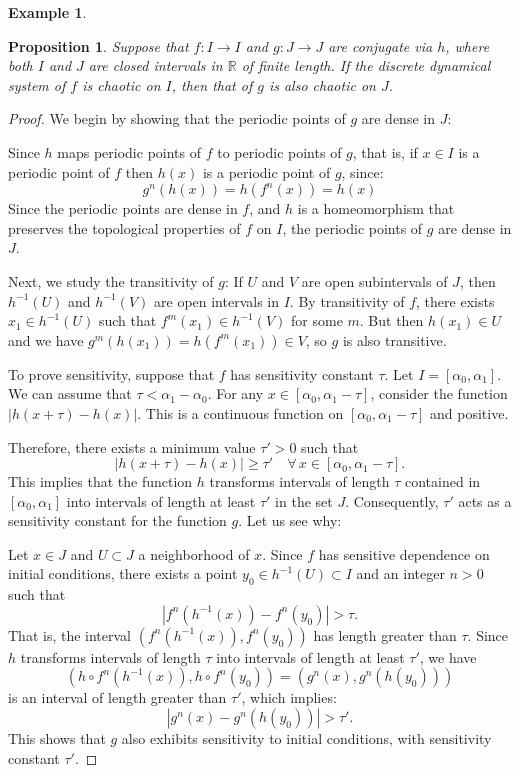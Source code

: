 \documentclass[12pt,a4paper]{report}
\newtheorem{proposicion}{Proposition}[section]
\theoremstyle{definition}
\newtheorem{ejemplo}{Example}[section]
\begin{document}
\begin{ejemplo}
\begin{proposicion}\label{Prop5}
Suppose that $f: I \to I$ and $g: J \to J$ are conjugate via $h$, where both $I$ and $J$ are closed intervals in $\mathbb{R}$ of finite length. If the discrete dynamical system of $f$ is chaotic on $I$, then that of $g$ is also chaotic on $J$.
\end{proposicion}

\begin{proof}
We begin by showing that the periodic points of $g$ are dense in $J$:

Since $h$ maps periodic points of $f$ to periodic points of $g$, that is, if $x \in I$ is a periodic point of $f$ then $h(x)$ is a periodic point of $g$, since:
\[
g^n(h(x)) = h(f^n(x)) = h(x)
\]
%
Since the periodic points are dense in $f$, and $h$ is a homeomorphism that preserves the topological properties of $f$ on $I$, the periodic points of $g$ are dense in $J$.

Next, we study the transitivity of $g$:
If $U$ and $V$ are open subintervals of $J$, then $h^{-1}(U)$ and $h^{-1}(V)$ are open intervals in $I$. By transitivity of $f$, there exists $x_1 \in h^{-1}(U)$ such that $f^m(x_1) \in h^{-1}(V)$ for some $m$. But then $h(x_1) \in U$ and we have $g^m(h(x_1)) = h(f^m(x_1)) \in V$, so $g$ is also transitive.

To prove sensitivity, suppose that $f$ has sensitivity constant $\tau$. Let $I = [\alpha_0, \alpha_1]$. We can assume that $\tau < \alpha_1 - \alpha_0$. For any $x \in [\alpha_0, \alpha_1 - \tau]$, consider the function $|h(x+\tau) - h(x)|$. This is a continuous function on $[\alpha_0, \alpha_1 - \tau]$ and positive.

Therefore, there exists a minimum value \( \tau' > 0 \) such that
\[
|h(x+\tau) - h(x)| \geq \tau' \quad \forall \, x \in [\alpha_0, \alpha_1 - \tau].
\]
This implies that the function \( h \) transforms intervals of length \( \tau \) contained in \( [\alpha_0, \alpha_1] \) into intervals of length at least \( \tau' \) in the set \( J \). Consequently, \( \tau' \) acts as a sensitivity constant for the function \( g \). Let us see why:

Let \( x \in J \) and \( U \subset J \) a neighborhood of \( x \). Since \( f \) has sensitive dependence on initial conditions, there exists a point \( y_0 \in h^{-1}(U) \subset I \) and an integer \( n > 0 \) such that
\[
\left| f^{n}(h^{-1}(x)) - f^{n}(y_0) \right| > \tau.
\]
That is, the interval \( (f^{n}(h^{-1}(x)), f^{n}(y_0)) \) has length greater than \( \tau \). Since \( h \) transforms intervals of length \( \tau \) into intervals of length at least \( \tau' \), we have
\[
(h \circ f^{n}(h^{-1}(x)), h \circ f^{n}(y_0)) = (g^{n}(x), g^{n}(h(y_0)))
\]
is an interval of length greater than \( \tau' \), which implies:
\[
|g^{n}(x) - g^{n}(h(y_0))| > \tau'.
\]
This shows that \( g \) also exhibits sensitivity to initial conditions, with sensitivity constant \( \tau' \).

\end{proof}

\end{ejemplo}
\end{document}
